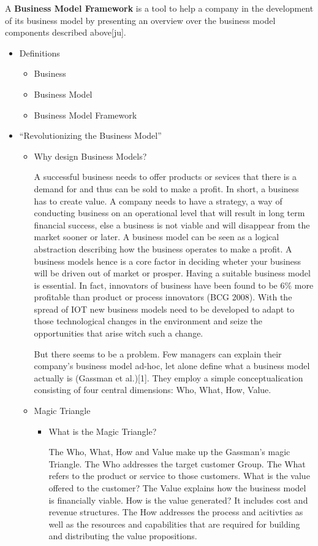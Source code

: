 	 A \textbf{Business Model Framework} is a tool to help a company in the development of its business model by presenting an overview over the business model components described above[ju].
	\begin{itemize}
		\item Definitions
		\cite{bmc}
		\cite{dijkman}
			\begin{itemize}
				\item Business 
				\item Business Model 
				\item Business Model Framework
			\end{itemize}
		\item ``Revolutionizing the Business Model''
			\cite{gassmann}
			\begin{itemize}
				\item Why design Business Models?
				
				A successful business needs to offer products or sevices that there is a demand for and thus can be sold to make a profit. In short, a business has to create value. A company needs to have a strategy, a way of conducting business on an operational level that will result in long term financial success, else a business is not viable and will disappear from the market sooner or later.
				A business model can be seen as a logical abstraction describing how the business operates to make a profit. A business models hence is a core factor in deciding wheter your business will be driven out of market or prosper. Having a suitable business model is essential. In fact, innovators of business have been found to be 6\% more profitable than product or process innovators (BCG 2008). With the spread of IOT new business models need to be developed to adapt to those technological changes in the environment and seize the opportunities that arise witch such a change. 

				But there seems to be a problem. Few managers can explain their company's business model ad-hoc, let alone define what a business model actually is (Gassman et al.)[1]. They employ a simple conceptualication consisting of four central dimensions: Who, What, How, Value. 
				\item Magic Triangle 

				\begin{itemize}
					\item What is the Magic Triangle?

					The Who, What, How and Value make up the Gassman's magic Triangle. 
					The Who addresses the target customer Group. 
					The What refers to the product or service to those customers. What is the value offered to the customer? 
					The Value explains how the business model is financially viable. How is the value generated? It includes cost and revenue structures.
					The How addresses the process and acitivties as well as the resources and capabilities that are required for building and distributing the value propositions.
					

\end{itemize}
\end{itemize}
\end{itemize}
